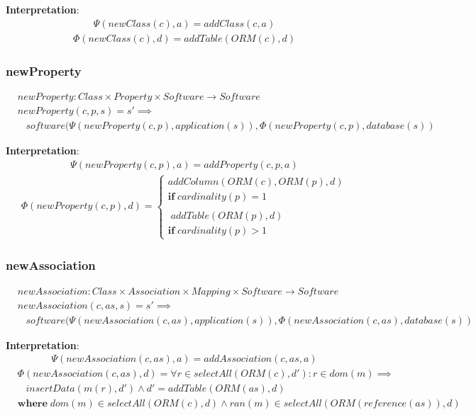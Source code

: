 \documentclass[10pt]{article}
\begin{document}
\noindent \textbf{Interpretation}:
\begin{align}
\Psi(newClass(c), a) = addClass(c, a)
\end{align}
\begin{align}
\Phi(newClass(c), d) = addTable(ORM(c),  d)
\end{align}


\subsubsection{newProperty}
\begin{align}
& newProperty: Class \times Property \times Software \rightarrow Software \\
& newProperty(c, p, s) = s' \implies \nonumber \\ 
& \;\;\; software(\Psi(newProperty(c, p), application(s)), \Phi(newProperty(c,p), database(s))
\end{align}

\noindent \textbf{Interpretation}:
\begin{align}
\Psi(newProperty(c, p), a) = addProperty(c, p, a)
\end{align}
\begin{align}
\Phi(newProperty(c, p), d) = \begin{cases}
  addColumn(ORM(c), ORM(p),  d) \\ \mathbf{if} \; cardinality(p) = 1  \\\\ 
  \; addTable(ORM(p),  d) \\
  \mathbf{if} \; cardinality(p) > 1  
   \end{cases}
\end{align}


\subsubsection{newAssociation}
\begin{align}
& newAssociation: Class \times Association \times Mapping \times Software \rightarrow Software \\
& newAssociation(c, as, s) = s' \implies \nonumber \\ 
& \;\;\; software(\Psi(newAssociation(c, as), application(s)), \Phi(newAssociation(c, as), database(s))
\end{align}

\noindent \textbf{Interpretation}:
\begin{align}
\Psi(newAssociation(c, as), a) = addAssociation(c, as, a)
\end{align}
\begin{align}
& \Phi(newAssociation(c, as), d) = \forall r \in selectAll(ORM(c), d') : r \in dom(m) \implies \nonumber \\ & \;\;\; insertData(m(r), d') \land d' = addTable(ORM(as),  d) \nonumber \\
& \mathbf{where} \; dom(m) \in selectAll(ORM(c),d) \land ran(m) \in selectAll(ORM(reference(as)), d)
\end{align}
\end{document}
